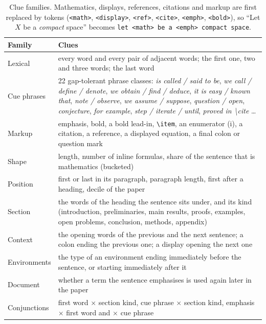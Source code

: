 \documentclass[10pt]{article}
\begin{document}
\begin{table}[h]
\centering\small
\caption{Clue families. Mathematics, displays, references, citations and markup are first replaced by tokens (\texttt{<math>}, \texttt{<display>}, \texttt{<ref>}, \texttt{<cite>}, \texttt{<emph>}, \texttt{<bold>}), so ``Let $X$ be a \emph{compact} space'' becomes \texttt{let <math> be a <emph> compact space}.}
\label{tab:clues}
\begin{tabular}{@{}lp{9.4cm}@{}}
\toprule
\textbf{Family} & \textbf{Clues} \\
\midrule
Lexical & every word and every pair of adjacent words; the first one, two and three words; the last word \\
Cue phrases & 22 gap-tolerant phrase classes: \emph{is called / said to be}, \emph{we call / define / denote}, \emph{we obtain / find / deduce}, \emph{it is easy / known that}, \emph{note / observe}, \emph{we assume / suppose}, \emph{question / open}, \emph{conjecture}, \emph{for example}, \emph{step / iterate / until}, \emph{proved in \textbackslash cite} \ldots \\
Markup & emphasis, bold, a bold lead-in, \verb|\item|, an enumerator (i), a citation, a reference, a displayed equation, a final colon or question mark \\
Shape & length, number of inline formulas, share of the sentence that is mathematics (bucketed) \\
Position & first or last in its paragraph, paragraph length, first after a heading, decile of the paper \\
Section & the words of the heading the sentence sits under, and its kind (introduction, preliminaries, main results, proofs, examples, open problems, conclusion, methods, appendix) \\
Context & the opening words of the previous and the next sentence; a colon ending the previous one; a display opening the next one \\
Environments & the type of an environment ending immediately before the sentence, or starting immediately after it \\
Document & whether a term the sentence emphasises is used again later in the paper \\
Conjunctions & first word $\times$ section kind, cue phrase $\times$ section kind, emphasis $\times$ first word and $\times$ cue phrase \\
\bottomrule
\end{tabular}
\end{table}
\end{document}
